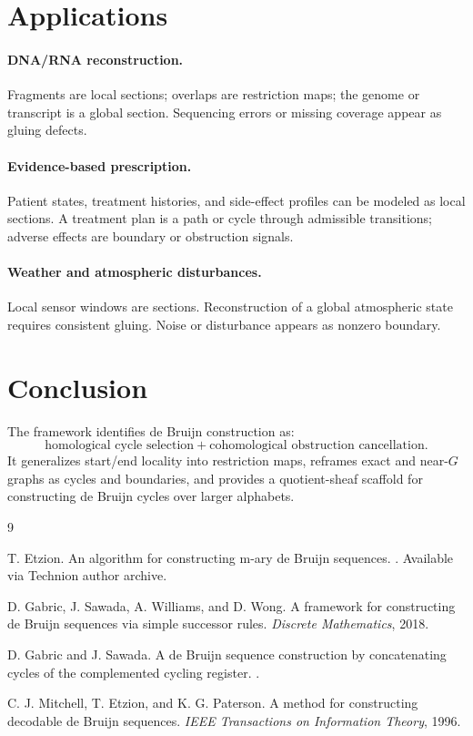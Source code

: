 \documentclass[11pt]{article}
\begin{document}
\section{Applications}

\paragraph{DNA/RNA reconstruction.}
Fragments are local sections; overlaps are restriction maps; the genome or transcript is a global section. Sequencing errors or missing coverage appear as gluing defects.

\paragraph{Evidence-based prescription.}
Patient states, treatment histories, and side-effect profiles can be modeled as local sections. A treatment plan is a path or cycle through admissible transitions; adverse effects are boundary or obstruction signals.

\paragraph{Weather and atmospheric disturbances.}
Local sensor windows are sections. Reconstruction of a global atmospheric state requires consistent gluing. Noise or disturbance appears as nonzero boundary.

\section{Conclusion}

The framework identifies de Bruijn construction as:
\[
\text{homological cycle selection}+\text{cohomological obstruction cancellation}.
\]
It generalizes start/end locality into restriction maps, reframes exact and near-\(G\) graphs as cycles and boundaries, and provides a quotient-sheaf scaffold for constructing de Bruijn cycles over larger alphabets.

\begin{thebibliography}{9}

T. Etzion.
\newblock An algorithm for constructing m-ary de Bruijn sequences.
. Available via Technion author archive.

D. Gabric, J. Sawada, A. Williams, and D. Wong.
\newblock A framework for constructing de Bruijn sequences via simple successor rules.
\newblock \emph{Discrete Mathematics}, 2018.

D. Gabric and J. Sawada.
\newblock A de Bruijn sequence construction by concatenating cycles of the complemented cycling register.
.

C. J. Mitchell, T. Etzion, and K. G. Paterson.
\newblock A method for constructing decodable de Bruijn sequences.
\newblock \emph{IEEE Transactions on Information Theory}, 1996.

\end{thebibliography}
\end{document}
